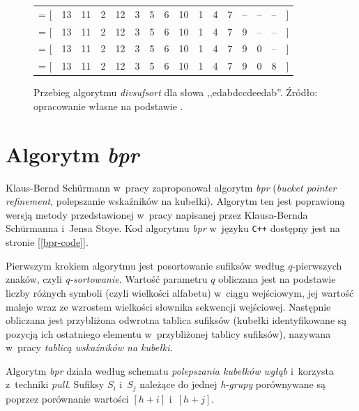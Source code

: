 \begin{figure}[t]
\begin{center}
\begin{tabular}{r c c c c c c c c c c c c c c l}
       \SA{} = [ & 13  & 11 & 2   & 12     & 3  & 5 & 6  & 10     & 1   & 4  & 7  & --     & --   & --    & ] \\  
       \SA{} = [ & 13  & 11 & 2   & 12     & 3  & 5 & 6  & 10     & 1   & 4  & 7  & 9     & --   & --    & ] \\  
       \SA{} = [ & 13  & 11 & 2   & 12     & 3  & 5 & 6  & 10     & 1   & 4  & 7  & 9     & 0   & --    & ] \\  
       \SA{} = [ & 13  & 11 & 2   & 12     & 3  & 5 & 6  & 10     & 1   & 4  & 7  & 9     & 0   & 8    & ] \\  
            \end{tabular}            
        \end{center}                         
    \caption{Przebieg algorytmu \emph{divsufsort} dla słowa ,,edabdccdeedab''.
 			Źródło: opracowanie własne na podstawie \cite{div}.}%
    \label{rys:div}
\end{figure}


\section{Algorytm \emph{bpr}}

Klaus-Bernd Schürmann w~pracy \cite{schurmann-phd} zaproponował algorytm
\emph{bpr} (\emph{bucket pointer refinement}, polepszanie wskaźników na
kubełki). Algorytm ten jest poprawioną wersją metody przedstawionej w~pracy
\cite{bpr-old} napisanej przez Klausa-Bernda Schürmanna i~Jensa Stoye. Kod
algorytmu \emph{bpr} w~języku \texttt{C++} dostępny jest na stronie [\ref{bpr-code}].

Pierwszym krokiem algorytmu jest posortowanie sufiksów według $q$-pierwszych
znaków, czyli \emph{q-sortowanie}. Wartość parametru $q$ obliczana jest na
podstawie liczby różnych symboli (czyli wielkości alfabetu) w~ciągu wejściowym, jej wartość maleje wraz ze
wzrostem wielkości słownika sekwencji wejściowej. Następnie obliczana jest
przybliżona odwrotna tablica sufiksów \ISA{} (kubełki identyfikowane są pozycją
ich ostatniego elementu w~przybliżonej tablicy sufiksów), nazywana w~pracy
\cite{schurmann-phd} \emph{tablicą wskaźników na kubełki}.

Algorytm \emph{bpr} działa według schematu \emph{polepszania kubełków wgłąb} i~korzysta z~techniki \emph{pull}. Sufiksy $S_i$ i~$S_j$ należące
do jednej \emph{h-grupy} porównywane są poprzez porównanie wartości
\ISA{}$[h + i]$ i~\ISA{}$[h + j]$.

